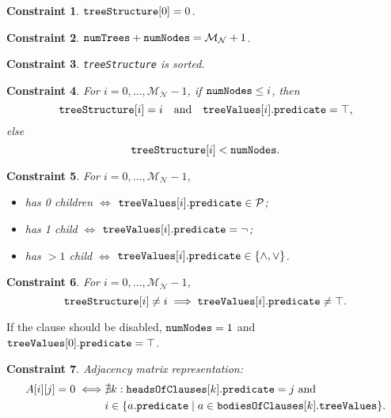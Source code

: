 \documentclass[runningheads]{llncs}
\newtheorem{constraint}{Constraint}
\newcommand{\variable}[1]{\texttt{\textup{#1}}}
\newcommand{\predicates}{\mathcal{P}}
\newcommand{\maxNumNodes}{\mathcal{M}_{\mathcal{N}}}
\begin{document}
\begin{constraint}
  $\variable{treeStructure}[0] = 0$.
\end{constraint}

\begin{constraint}
  $\variable{numTrees} + \variable{numNodes} = \maxNumNodes{} + 1$.
\end{constraint}

\begin{constraint}
  \variable{treeStructure} is sorted.
\end{constraint}

\begin{constraint}
  For $i = 0, \dots, \maxNumNodes{} - 1$, if $\variable{numNodes} \le
  i$, then
  \[
    \variable{treeStructure}[i] = i \quad \text{and} \quad
    \variable{treeValues}[i].\variable{predicate} = \top,
  \]
  else
  \[
    \variable{treeStructure}[i] < \variable{numNodes}.
  \]
\end{constraint}

\begin{constraint}
  For $i = 0, \dots, \maxNumNodes{} - 1$,
  \begin{itemize}
  \item has 0 children $\iff$ $\variable{treeValues}[i].\variable{predicate} \in
    \predicates{}$;
  \item has 1 child $\iff$ $\variable{treeValues}[i].\variable{predicate} = \neg$;
  \item has $>1$ child $\iff$ $\variable{treeValues}[i].\variable{predicate} \in
    \{ \land, \lor \}$.
  \end{itemize}
\end{constraint}

\begin{constraint}
  For $i = 0, \dots, \maxNumNodes{} - 1$,
  \[
    \variable{treeStructure}[i] \ne i \implies
    \variable{treeValues}[i].\variable{predicate} \ne \top.
  \]
\end{constraint}

If the clause should be disabled, $\variable{numNodes} = 1$ and
$\variable{treeValues}[0].\variable{predicate} = \top$.

\begin{constraint}
  Adjacency matrix representation:
  \begin{align*}
    A[i][j] = 0 \iff &\nexists k: \variable{headsOfClauses}[k].\variable{predicate} = j \text{ and } \\
    &i \in \{ a.\variable{predicate} \mid a \in \variable{bodiesOfClauses}[k].\variable{treeValues} \}.
  \end{align*}
\end{constraint}
\end{document}
